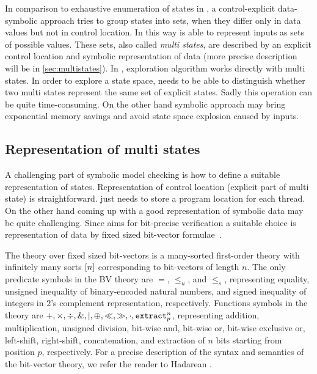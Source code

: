 In comparison to exhaustive enumeration of states in \DIVINE, a control-explicit
data-symbolic approach tries to group states into sets, when they differ only in
data values but not in control location. In this way \SymDIVINE is able to
represent inputs as sets of possible values. These sets, also called \emph{multi
states}, are described by an explicit control location and symbolic
representation of data (more precise description will be in
\autoref{sec:multistates}). In \SymDIVINE, exploration algorithm works directly
with multi states. In order to explore a state space, \SymDIVINE needs to be
able to distinguish whether two multi states represent the same set of explicit
states. Sadly this operation can be quite time-consuming. On the other hand
symbolic approach may bring exponential memory savings and avoid state space
explosion caused by inputs.

\subsection{Representation of multi states} \label{sec:multistates}

A challenging part of symbolic model checking is how to define a suitable
representation of states. Representation of control location (explicit part of
multi state) is straightforward. \SymDIVINE just needs to store
a program location for each thread. On the other hand coming up with a good
representation of symbolic data may be quite challenging. Since \SymDIVINE aims
for bit-precise verification a suitable choice is representation of data
by fixed sized bit-vector formulae~\cite{Bauch14}.

The theory over fixed sized bit-vectors is a many-sorted first-order theory with
infinitely many sorts $[n]$ corresponding to bit-vectors of length $n$. The
only predicate symbols in the BV theory are $=$, $\leq_u$, and $\leq_s$,
representing equality, unsigned inequality of binary-encoded natural numbers,
and signed inequality of integers in $2$'s complement representation,
respectively. Functions symbols in the theory are $+, \times, \div, \&, \mid,
\oplus, \ll, \gg, \cdot, \texttt{extract}^{n}_{p}$, representing addition, multiplication,
unsigned division, bit-wise and, bit-wise or, bit-wise exclusive or, left-shift,
right-shift, concatenation, and extraction of $n$ bits starting from position
$p$, respectively. For a precise description of the syntax and semantics of the
bit-vector theory, we refer the reader to Hadarean \cite{Hadarean14}.

